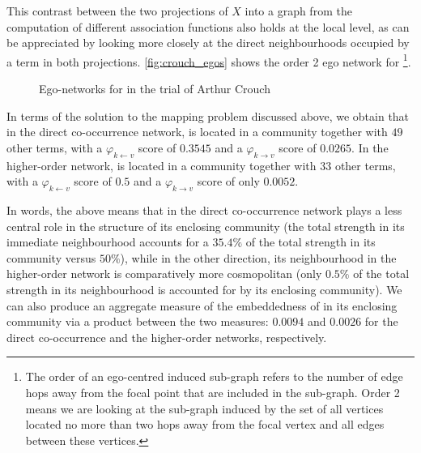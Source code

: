This contrast between the two projections of $X$ into a graph from the computation of different association functions also holds at the local level, as can be appreciated by looking more closely at the direct neighbourhoods occupied by a term in both projections.
\autoref{fig:crouch_egos} shows the order 2 ego network for \footnote{
    The order of an ego-centred induced sub-graph refers to the number of edge hops away from the focal point that are included in the sub-graph.
    Order 2 means we are looking at the sub-graph induced by the set of all vertices located no more than two hops away from the focal vertex and all edges between these vertices.
}.

\begin{figure}
    \centerfloat
    
    \caption{Ego-networks for  in the trial of Arthur Crouch}
    \label{fig:crouch_egos}
\end{figure}

In terms of the solution to the mapping problem discussed above, we obtain that in the direct co-occurrence network,  is located in a community together with $49$ other terms, with a $\varphi_{k \leftarrow v}$ score of $0.3545$ and a $\varphi_{k \rightarrow v}$ score of $0.0265$.
In the higher-order network,  is located in a community together with $33$ other terms, with a  $\varphi_{k \leftarrow v}$ score of $0.5$ and a $\varphi_{k \rightarrow v}$ score of only $0.0052$.

In words, the above means that in the direct co-occurrence network  plays a less central role in the structure of its enclosing community (the total strength in its immediate neighbourhood accounts for a $35.4\%$ of the total strength in its community versus $50\%$), while in the other direction, its neighbourhood in the higher-order network is comparatively more cosmopolitan (only $0.5\%$ of the total strength in its neighbourhood is accounted for by its enclosing community).
We can also produce an aggregate measure of the embeddedness of  in its enclosing community via a product between the two measures: $0.0094$ and $0.0026$ for the direct co-occurrence and the higher-order networks, respectively.

%
% 
%
% 

